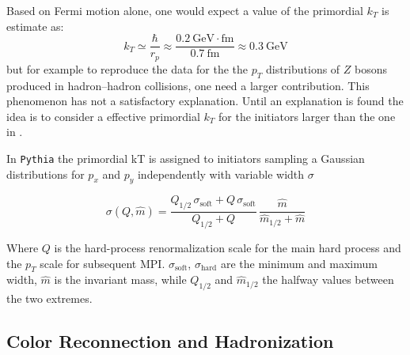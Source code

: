 \bigskip

Based on Fermi motion alone, one would expect a value of the primordial $k_T$ is estimate as: 
\begin{equation}
	k_T\simeq\frac{\hbar}{r_p}\approx\frac{0.2\ \mathrm{GeV\cdot fm}}{0.7\ \mathrm{fm}}\approx0.3\ \mathrm{GeV}
\label{eq:PrimordialKT}
\end{equation}
but for example to reproduce the data for the the $p_T$ distributions of $Z$ bosons produced in hadron–hadron collisions, one need a larger contribution. This phenomenon has not a satisfactory explanation. Until an explanation is found the idea is to consider a effective primordial $k_T$ for the initiators larger than the one in .

In \texttt{Pythia} the primordial kT is assigned to initiators sampling a Gaussian distributions for $p_x$ and $p_y$ independently with variable width $\sigma$

\begin{equation}
	\sigma(Q,\widehat{m})=\frac{Q_{1/2}\,\sigma_{\text{soft}}+Q\,\sigma_{\text{soft}}}{Q_{1/2}+Q}\,\frac{\widehat{m}}{\widehat{m}_{1/2}+\widehat{m}}
\end{equation}
 
Where $Q$ is the hard-process renormalization scale for the main hard process and the $p_T$ scale for subsequent MPI. $\sigma_{\text{soft}}$, $\sigma_{\text{hard}}$ are the minimum and maximum width, $\widehat{m}$ is the invariant mass, while $Q_{1/2}$ and $\widehat{m}_{1/2}$ the halfway values between the two extremes.

\subsection{Color Reconnection and Hadronization }